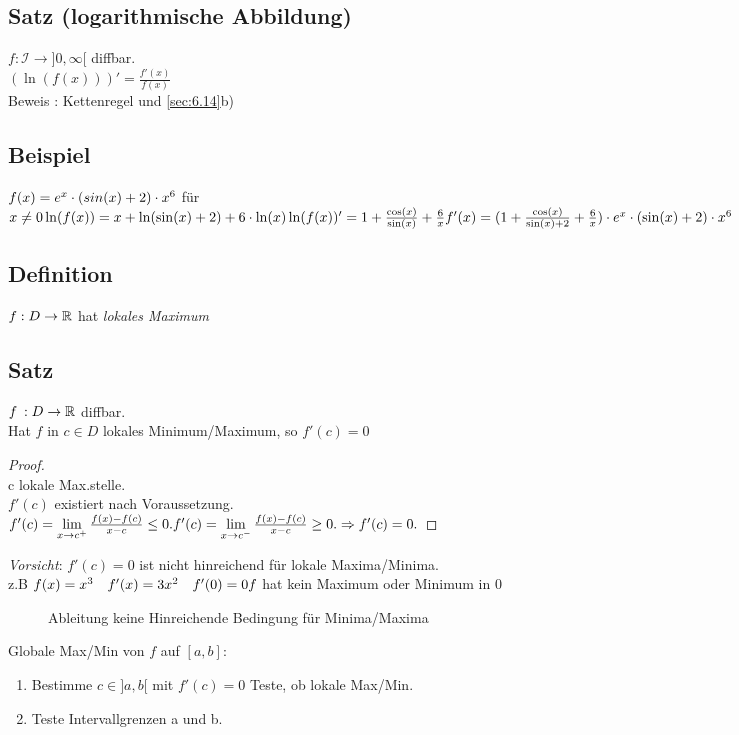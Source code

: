 \subsection{Satz (logarithmische Abbildung)}
$f : \mathcal{I} \to ]0,\infty[$ diffbar.\\
$(\ln(f(x)))' = \frac{f'(x)}{f(x)}$\\
Beweis : Kettenregel und \ref{sec:6.14}b)\\
\subsection{Beispiel}
$f(x) = e^x \cdot (sin(x) +2) \cdot x^6$ für $x \ne 0\\
\ln(f(x)) = x + \ln(\sin(x) +2) + 6 \cdot \ln(x)\\
\ln(f(x))' = 1 + \frac{\cos(x)}{\sin(x)} + \frac{6}{x}\\
f'(x) = (1 + \frac{\cos(x)}{\sin(x) + 2} + \frac{6}{x}) \cdot e^x \cdot (\sin(x) + 2) \cdot x^6$\\
\subsection{Definition}
$f : D \to \mathbb{R} $ hat \emph{lokales Maximum}
	\subsection[Satz]{Satz}\label{sec:6.18}
	$f\: : D \to \mathbb{R} $ diffbar.\\
	Hat $f$ in $c \in D$ lokales Minimum/Maximum, so $f'(c) =0$
	\begin{proof}
		\ \\
		c lokale Max.stelle.\\
		$f'(c)$ existiert nach Voraussetzung.\\
		$ f'(c) = \lim\limits_{x \to c^+} \frac{f(x) - f(c)}{x-c}\le 0.\\
		f'(c) = \lim\limits_{x \to c^-} \frac{f(x) - f(c)}{x-c}\ge 0.\\
		\Rightarrow f'(c) = 0.$
	\end{proof}
	\emph{Vorsicht}: $f'(c) = 0$ ist nicht hinreichend für lokale Maxima/Minima.\\
	z.B $f(x) = x^3 \quad f'(x) = 3x^2\quad f'(0) = 0\\
	f$ hat kein Maximum oder Minimum in 0\\
	\begin{figure}[h!]
		\centering
		\caption{Ableitung keine Hinreichende Bedingung für Minima/Maxima}
	\end{figure}
	Globale Max/Min von $f$ auf $[a,b]$:
	\begin{enumerate}[-]
		\item Bestimme $c \in ]a,b[$ mit $f'(c) = 0$ Teste, ob lokale Max/Min.
		\item Teste Intervallgrenzen a und b.
	\end{enumerate}
